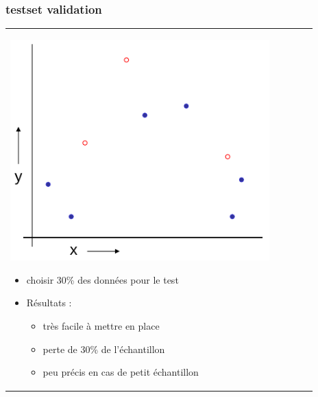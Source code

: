 \documentclass[handout]{beamer}
\begin{document}
		\begin{frame}
		\frametitle{testset validation}
		\begin{tabular}{l l}
			\begin{minipage}{0.5\textwidth}
				\begin{center}
					\includegraphics[width=0.9\textwidth]{images/testset.png}
				\end{center}
			\end{minipage}

			\begin{minipage}{0.5\textwidth}
				\begin{itemize}
					\item choisir 30\% des données pour le test
					\item Résultats :
					\begin{itemize}
						\item très facile à mettre en place
						\item perte de 30\% de l'échantillon
						\item peu précis en cas de petit échantillon
					\end{itemize}
				\end{itemize}
			\end{minipage}

		\end{tabular}
		\end{frame}
\end{document}
